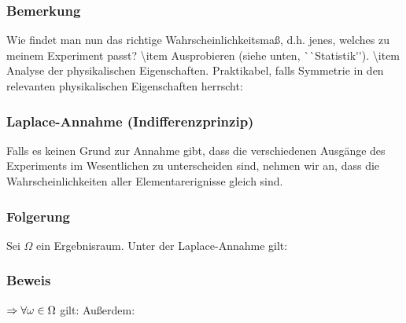 \subsubsection{Bemerkung}
Wie findet man nun das richtige Wahrscheinlichkeitsma\ss{}, d.h. jenes, welches zu meinem Experiment passt?
\num{
\item Ausprobieren (siehe unten, ``Statistik'').
\item Analyse der physikalischen Eigenschaften. Praktikabel, falls Symmetrie in den relevanten physikalischen Eigenschaften herrscht:
}
\subsubsection{Laplace-Annahme (Indifferenzprinzip)}
Falls es keinen Grund zur Annahme gibt, dass die verschiedenen Ausg\"ange des Experiments im Wesentlichen zu unterscheiden sind, nehmen wir an, dass die Wahrscheinlichkeiten aller Elementarerignisse gleich sind.
\subsubsection{Folgerung}
Sei $\Omega$ ein Ergebnisraum. Unter der Laplace-Annahme gilt:
\subsubsection{Beweis}
$\Rightarrow\forall\omega\in\Omega$ gilt:
Au\ss{}erdem:
